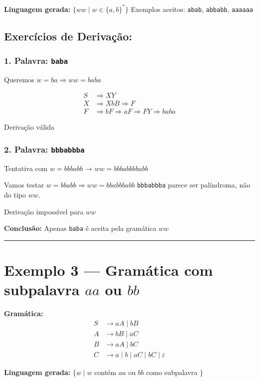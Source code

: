 \documentclass[12pt]{article}
\begin{document}
\textbf{Linguagem gerada:} $\{ ww \mid w \in \{a, b\}^* \}$  
Exemplos aceitos: \texttt{abab}, \texttt{abbabb}, \texttt{aaaaaa}

\subsection*{Exercícios de Derivação:}

\subsubsection*{1. Palavra: \texttt{baba}}

Queremos $w = ba \Rightarrow ww = baba$

\begin{align*}
S &\Rightarrow XY \\
X &\Rightarrow XbB \Rightarrow F \\
F &\Rightarrow bF \Rightarrow aF \Rightarrow FY \Rightarrow baba
\end{align*}

Derivação válida

\subsubsection*{2. Palavra: \texttt{bbbabbba}}

Tentativa com $w = bbbabb$ → $ww = bbbabbbbabb$

Vamos testar $w = bbabb \Rightarrow ww = bbabbbabb$  
\texttt{bbbabbba} parece ser palíndroma, não do tipo $ww$.

Derivação impossível para $ww$

\textbf{Conclusão:} Apenas \texttt{baba} é aceita pela gramática $ww$

\hrule

\section*{Exemplo 3 — Gramática com subpalavra $aa$ ou $bb$}

\textbf{Gramática:}
\begin{align*}
S &\rightarrow aA \mid bB \\
A &\rightarrow bB \mid aC \\
B &\rightarrow aA \mid bC \\
C &\rightarrow a \mid b \mid aC \mid bC \mid \varepsilon
\end{align*}

\textbf{Linguagem gerada:} $\{ w \mid w$ contém $aa$ ou $bb$ como subpalavra $\}$
\end{document}
